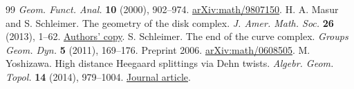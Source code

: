 \documentclass[11pt,a4paper]{article}
\begin{document}
\begin{thebibliography}{99}
\emph{Geom. Funct. Anal.} \textbf{10} (2000), 902--974.
\href{https://arxiv.org/abs/math/9807150}{arXiv:math/9807150}.
 H. A. Masur and S. Schleimer. The geometry of the disk
complex. \emph{J. Amer. Math. Soc.} \textbf{26} (2013), 1--62.
\href{https://sschleimer.warwick.ac.uk/Maths/2012geom_disk_complex.pdf}{Authors' copy}.
 S. Schleimer. The end of the curve complex.
\emph{Groups Geom. Dyn.} \textbf{5} (2011), 169--176. Preprint 2006.
\href{https://arxiv.org/abs/math/0608505}{arXiv:math/0608505}.
 M. Yoshizawa. High distance Heegaard splittings via Dehn
twists. \emph{Algebr. Geom. Topol.} \textbf{14} (2014), 979--1004.
\href{https://msp.org/agt/2014/14-2/agt-v14-n2-p13-s.pdf}{Journal article}.
\end{thebibliography}
\end{document}
